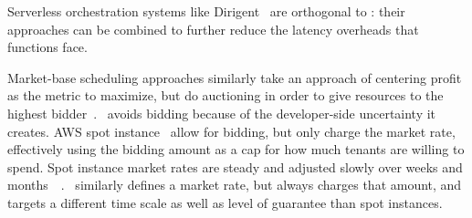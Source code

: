 Serverless orchestration systems like Dirigent~\cite{dirigent} are orthogonal to
\sys{}: their approaches can be combined to further reduce the latency overheads
that functions face.

Market-base scheduling approaches similarly take an approach of centering profit
as the metric to maximize, but do auctioning in order to give resources to the
highest bidder~\cite{bellagio-market-based,online-auctioning}.~\Sys{} avoids
bidding because of the developer-side uncertainty it creates. AWS spot
instance~\cite{spot-instance-pricing} allow for bidding, but only charge the
market rate, effectively using the bidding amount as a cap for how much tenants
are willing to spend. Spot instance market rates are steady and adjusted slowly
over weeks and months~~\cite{spot-instance-history}.~\Sys{} similarly defines a
market rate, but always charges that amount, and targets a different time scale
as well as level of guarantee than spot instances.

